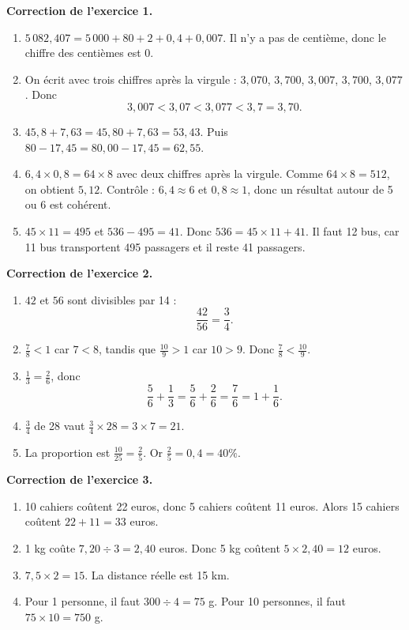 \documentclass[11pt,a4paper]{article}
\newcounter{exo}
\begin{document}
\setcounter{exo}{0}
\begin{corrbox}
\textbf{Correction de l'exercice 1.}
\begin{enumerate}[label=\alph*)]
\item \(5\,082,407=5\,000+80+2+0,4+0,007\). Il n'y a pas de centième, donc le chiffre des centièmes est 0.
\item On écrit avec trois chiffres après la virgule : \(3,070\), \(3,700\), \(3,007\), \(3,700\), \(3,077\). Donc
\[
3,007<3,07<3,077<3,7=3,70.
\]
\item \(45,8+7,63=45,80+7,63=53,43\). Puis \(80-17,45=80,00-17,45=62,55\).
\item \(6,4\times0,8=64\times8\) avec deux chiffres après la virgule. Comme \(64\times8=512\), on obtient \(5,12\). Contrôle : \(6,4\approx6\) et \(0,8\approx1\), donc un résultat autour de 5 ou 6 est cohérent.
\item \(45\times11=495\) et \(536-495=41\). Donc \(536=45\times11+41\). Il faut 12 bus, car 11 bus transportent 495 passagers et il reste 41 passagers.
\end{enumerate}
\end{corrbox}

\begin{corrbox}
\textbf{Correction de l'exercice 2.}
\begin{enumerate}[label=\alph*)]
\item \(42\) et \(56\) sont divisibles par 14 :
\[
\frac{42}{56}=\frac{3}{4}.
\]
\item \(\frac78<1\) car \(7<8\), tandis que \(\frac{10}{9}>1\) car \(10>9\). Donc \(\frac78<\frac{10}{9}\).
\item \(\frac13=\frac26\), donc
\[
\frac56+\frac13=\frac56+\frac26=\frac76=1+\frac16.
\]
\item \(\frac34\) de 28 vaut \(\frac34\times28=3\times7=21\).
\item La proportion est \(\frac{10}{25}=\frac25\). Or \(\frac25=0,4=40\%\).
\end{enumerate}
\end{corrbox}

\begin{corrbox}
\textbf{Correction de l'exercice 3.}
\begin{enumerate}[label=\alph*)]
\item 10 cahiers coûtent 22 euros, donc 5 cahiers coûtent 11 euros. Alors 15 cahiers coûtent \(22+11=33\) euros.
\item 1 kg coûte \(7,20\div3=2,40\) euros. Donc 5 kg coûtent \(5\times2,40=12\) euros.
\item \(7,5\times2=15\). La distance réelle est 15 km.
\item Pour 1 personne, il faut \(300\div4=75\) g. Pour 10 personnes, il faut \(75\times10=750\) g.
\end{enumerate}
\end{corrbox}
\end{document}
